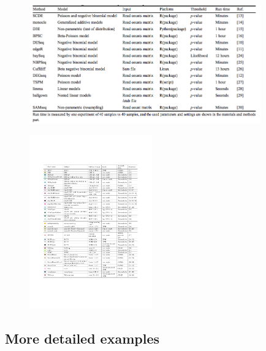\documentclass{beamer}\usepackage[]{graphicx}\usepackage[]{color}
\begin{document}
\begin{frame}
\begin{center}
\begin{figure}
\includegraphics[width=10cm]{Images/MiaoTable1.png}
\caption{\cite{Miao2016}}
\end{figure}
\end{center}
\end{frame}

\begin{frame}
\begin{center}
\begin{figure}
\includegraphics[trim={0 5cm 0 5cm}, clip, height=7.5cm]{Images/Robinson-2018.pdf}
\caption{\cite{Soneson2018}}
\end{figure}
\end{center}
\end{frame}

\subsection{More detailed examples}
\begin{frame}
\begin{center}
\insertsubsection
\end{center}
\end{frame}
\end{document}
